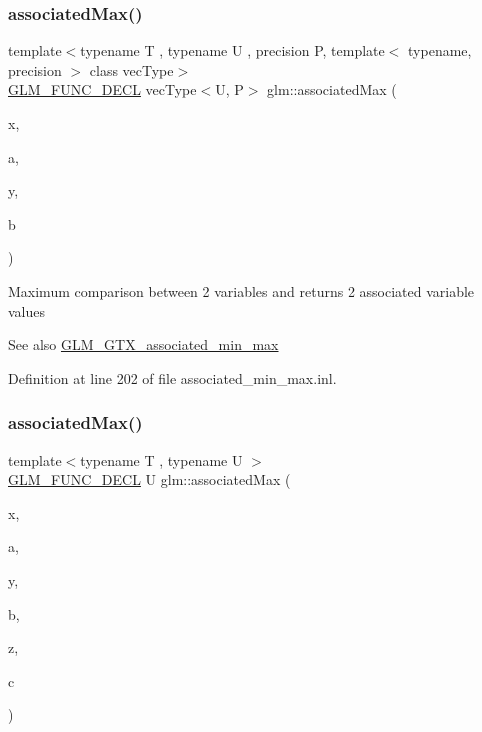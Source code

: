 \subsubsection{\texorpdfstring{associatedMax()}{associatedMax()}\hspace{0.1cm}{\footnotesize\ttfamily [4/12]}}
{\footnotesize\ttfamily template$<$typename T , typename U , precision P, template$<$ typename, precision $>$ class vec\+Type$>$ \\
\mbox{\hyperlink{setup_8hpp_ab2d052de21a70539923e9bcbf6e83a51}{G\+L\+M\+\_\+\+F\+U\+N\+C\+\_\+\+D\+E\+CL}} vec\+Type$<$U, P$>$ glm\+::associated\+Max (\begin{DoxyParamCaption}\item[{vec\+Type$<$ T, P $>$ const \&}]{x,  }\item[{U}]{a,  }\item[{vec\+Type$<$ T, P $>$ const \&}]{y,  }\item[{U}]{b }\end{DoxyParamCaption})}

Maximum comparison between 2 variables and returns 2 associated variable values \begin{DoxySeeAlso}{See also}
\mbox{\hyperlink{group__gtx__associated__min__max}{G\+L\+M\+\_\+\+G\+T\+X\+\_\+associated\+\_\+min\+\_\+max}} 
\end{DoxySeeAlso}


Definition at line 202 of file associated\+\_\+min\+\_\+max.\+inl.

\mbox{\label{group__gtx__associated__min__max_gaec891e363d91abbf3a4443cf2f652209}} 
\subsubsection{\texorpdfstring{associatedMax()}{associatedMax()}\hspace{0.1cm}{\footnotesize\ttfamily [5/12]}}
{\footnotesize\ttfamily template$<$typename T , typename U $>$ \\
\mbox{\hyperlink{setup_8hpp_ab2d052de21a70539923e9bcbf6e83a51}{G\+L\+M\+\_\+\+F\+U\+N\+C\+\_\+\+D\+E\+CL}} U glm\+::associated\+Max (\begin{DoxyParamCaption}\item[{T}]{x,  }\item[{U}]{a,  }\item[{T}]{y,  }\item[{U}]{b,  }\item[{T}]{z,  }\item[{U}]{c }\end{DoxyParamCaption})}

